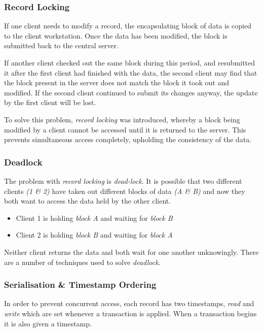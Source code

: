 \documentclass[9pt]{article}
\begin{document}
\subsubsection{Record Locking}
\label{sec:orga3ba708}

If one client needs to modify a record, the encapsulating block of data is copied to the client workstation. Once the data has been modified, the block is submitted back to the central server.

If another client checked out the same block during this period, and resubmitted it after the first client had finished with the data, the second client may find that the block present in the server does not match the block it took out and modified. If the second client continued to submit its changes anyway, the update by the first client will be lost.

To solve this problem, \emph{record locking} was introduced, whereby a block being modified by a client cannot be accessed until it is returned to the server. This prevents simultaneous access completely, upholding the consistency of the data.

\subsubsection{Deadlock}
\label{sec:org962a1a1}

The problem with \emph{record locking} is \emph{dead-lock}. It is possible that two different clients \emph{(1 \& 2)} have taken out different blocks of data \emph{(A \& B)} and now they both want to access the data held by the other client.

\begin{itemize}
\item Client 1 is holding \emph{block A} and waiting for \emph{block B}
\item Client 2 is holding \emph{block B} and waiting for \emph{block A}
\end{itemize}

Neither client returns the data and both wait for one another unknowingly. There are a number of techniques used to solve \emph{deadlock}.

\subsubsection{Serialisation \& Timestamp Ordering}
\label{sec:orgcfa7c6a}

In order to prevent concurrent access, each record has two timestamps, \emph{read} and \emph{write} which are set whenever a transaction is applied. When a transaction begins it is also given a timestamp.
\end{document}
